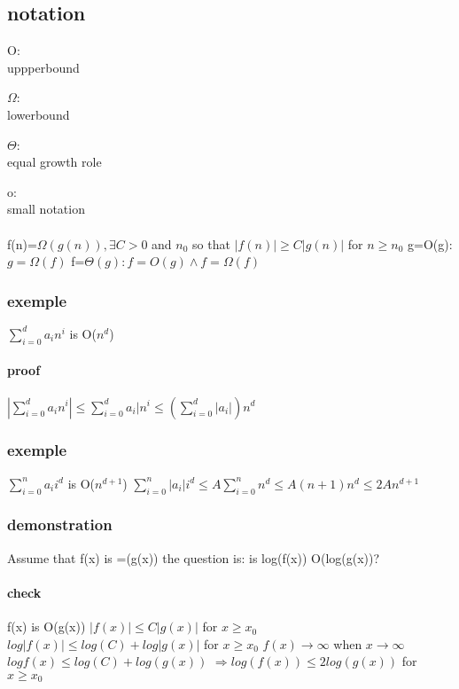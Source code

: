 \documentclass[a4paper,10pt]{article}
\begin{document}
{\subsection{notation}
\begin{description}
 \item O:\\{uppperbound}
 \item $\Omega$:\\{lowerbound} 
 \item $\Theta$:\\{equal growth role}
 \item o:\\{small notation}
\end{description}
\paragraph{}
f(n)=$\Omega(g(n)),\exists C>0$ and $n_0$ so that $|f(n)|\geq C|g(n)|$ for $n\geq n_0$
\newline
g=O(g):$g=\Omega(f)$
\newline
f=$\Theta(g):f=O(g)\wedge f=\Omega(f)$
\subsubsection{exemple}
$\sum_{i=0}^{d}a_in^i$ is O($n^d$)
\paragraph{proof}
$|\sum_{i=0}^{d}a_in^i|\leq\sum_{i=0}^{d}a_i|n^i\leq(\sum_{i=0}^{d}|a_i|)n^d
$\subsubsection{exemple}
$\sum_{i=0}^na_ii^d$ is O($n^{d+1}$)
\newline
$\sum_{i=0}^{n}|a_i|i^d\leq A\sum_{i=0}^nn^d\leq A(n+1)n^d\leq 2An^{d+1}$
\subsubsection{demonstration}
Assume that f(x) is =(g(x))
\newline
the question is: is log(f(x)) O(log(g(x))?
\paragraph{check}
f(x) is O(g(x))
\newline
$|f(x)|\leq C|g(x)|$ for $x\geq x_0$
\newline
$log|f(x)|\leq log(C)+log|g(x)|$ for $x\geq x_0$
\newline
$f(x)\rightarrow\infty$ when $x\rightarrow\infty$
\newline
$logf(x)\leq log(C)+log(g(x))$
\newline
$\Rightarrow log(f(x))\leq 2log(g(x))$ for $x\geq x_0$
}
\end{document}
